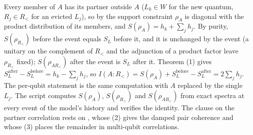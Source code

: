 Every member of $A$ has its partner outside $A$ ($L_k \in W$ for the new quantum, $R_j \in R_{<}$ for an evicted $L_j$), so by the support constraint $\rho_A$ is diagonal with the product distribution of its members, and $S(\rho_A) = h_k + \sum_j h_j$. By purity, $S(\rho_{R_<})$ before the event equals $S_L$ before it, and it is unchanged by the event (a unitary on the complement of $R_<$ and the adjunction of a product factor leave $\rho_{R_<}$ fixed); $S(\rho_{AR_<})$ after the event is $S_L$ after it. Theorem (1) gives $S_L^{\mathrm{after}} - S_L^{\mathrm{before}} = h_k - \sum_j h_j$, so $I(A{:}R_<) = S(\rho_A) + S_L^{\mathrm{before}} - S_L^{\mathrm{after}} = 2\sum_j h_j$. The per-qubit statement is the same computation with $A$ replaced by the single $L_j$. The script computes $S(\rho_A)$, $S(\rho_{R_<})$ and $S(\rho_{AR_<})$ from exact spectra at every event of the model's history and verifies the identity. The clause on the partner correlation rests on , whose (2) gives the damped pair coherence and whose (3) places the remainder in multi-qubit correlations.
